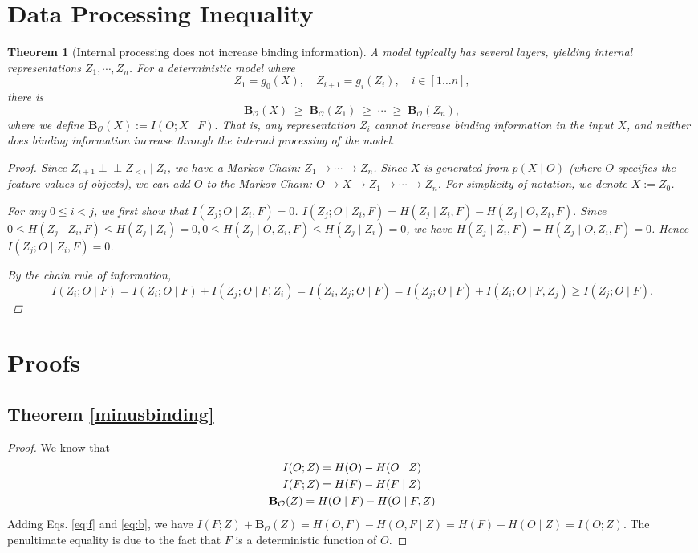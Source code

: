 \documentclass{article}
\theoremstyle{plain}
\newtheorem{theorem}{Theorem}[section]
\theoremstyle{definition}
\theoremstyle{remark}
\begin{document}
\section{Data Processing Inequality}

\begin{theorem}[Internal processing does not increase binding information]
\label{th:dpi}
A model typically has several layers, yielding internal representations $Z_1,\cdots, Z_n$. For a deterministic model where \[Z_1=g_0(X),\quad Z_{i+1}=g_i(Z_i),\quad i\in[1\dots n],\] there is \[\mathbf{B}_{\mathcal{O}}(X) \;\ge\; \mathbf{B}_{\mathcal{O}}(Z_1) \;\ge\; \cdots \;\ge\; \mathbf{B}_{\mathcal{O}}(Z_n),\] where we define \(\mathbf{B}_{\mathcal{O}}(X):=I(O;X\mid F).\) That is, any representation $Z_i$ cannot increase binding information in the input $X$, and neither does binding information increase through the internal processing of the model.

\begin{proof}

Since $Z_{i+1}\perp\!\!\!\perp Z_{<i}\mid Z_{i}$, we have a Markov Chain: $Z_1\to\cdots\to Z_n$. Since $X$ is generated from $p(X\mid O)$ (where $O$ specifies the feature values of objects), we can add $O$ to the Markov Chain: $O\to X \to Z_1\to\cdots\to Z_n$. For simplicity of notation, we denote $X:=Z_0$.

For any $0\leq i<j$, we first show that $I(Z_{j}; O\mid Z_{i}, F)=0$. \(I(Z_{j}; O\mid Z_{i}, F)=H(Z_j\mid Z_i,F)-H(Z_j\mid O, Z_i, F).\) Since \(0\leq H(Z_j\mid Z_i,F)\leq H(Z_j\mid Z_i)=0, 0\leq H(Z_j\mid O, Z_i,F)\leq H(Z_j\mid Z_i)=0\), we have \(H(Z_j\mid Z_i,F)=H(Z_j\mid O, Z_i,F)=0\). Hence $I(Z_{j}; O\mid Z_{i}, F)=0$.

By the chain rule of information, \[I(Z_i;O\mid F)=I(Z_i;O\mid F)+I(Z_j; O\mid F, Z_i)=I(Z_i, Z_j; O\mid F)=I(Z_j; O\mid F)+I(Z_i; O\mid F, Z_j)\geq I(Z_j; O\mid F).\]
\end{proof}  

\end{theorem}

\section{Proofs}
\label{pf:dpi}
\subsection{Theorem \ref{minusbinding}}
\begin{proof}
    We know that  
    \begin{gather}
     I(O;Z) = H(O) - H(O\mid Z) \notag \\
      I(F;Z) = H(F) - H(F\mid Z) \label{eq:f} \\
      \mathbf{B}_{\mathcal{O}}(Z) = H(O\mid F) - H(O\mid F,Z)   \label{eq:b}
    \end{gather}    
    Adding Eqs. \ref{eq:f} and \ref{eq:b}, we have $I(F;Z)+\mathbf{B}_{\mathcal{O}}(Z)=H(O, F)-H(O,F\mid Z)=H(F)-H(O\mid Z)=I(O;Z).$
    The penultimate equality is due to the fact that $F$ is a deterministic function of $O$.
\end{proof}
\end{document}
